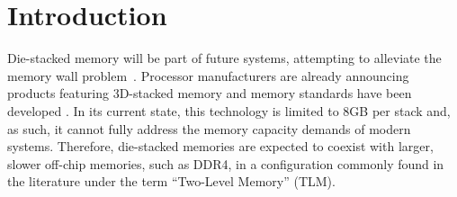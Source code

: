 \section{Introduction}
\label{sec:Introduction}
 


Die-stacked memory will be part of future systems, attempting to alleviate 
the memory wall problem~\cite{wulf-can95}. Processor manufacturers are 
already announcing products featuring 3D-stacked memory \cite{KnightsLanding,NVIDIA,black-micro2013}  and memory standards have been developed \cite{jedec-wideio,JEDEC-HBM,pawlowski-hotchips2011}. 
In its current state, this technology is limited to 8GB per stack \cite{JEDEC-HBM-REVISED} and, as such, it cannot fully address the memory capacity demands of modern systems. Therefore, die-stacked memories are expected to coexist with larger, slower off-chip memories, such as DDR4, in a configuration commonly found in the literature under the term ``Two-Level Memory'' (TLM).  

